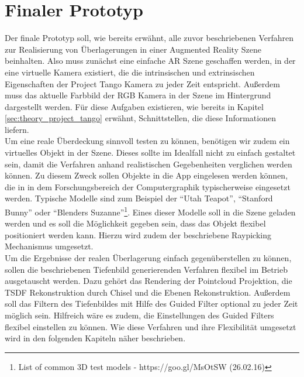 \section{Finaler Prototyp} \label{sec:final_prototype}

Der finale Prototyp soll, wie bereits erwähnt, alle zuvor beschriebenen Verfahren zur Realisierung von Überlagerungen in einer Augmented Reality Szene beinhalten. Also muss zunächst eine einfache AR Szene geschaffen werden, in der eine virtuelle Kamera existiert, die die intrinsischen und extrinsischen Eigenschaften der Project Tango Kamera zu jeder Zeit entspricht. Außerdem muss das aktuelle Farbbild der RGB Kamera in der Szene im Hintergrund dargestellt werden. Für diese Aufgaben existieren, wie bereits in Kapitel \ref{sec:theory_project_tango} erwähnt, Schnittstellen, die diese Informationen liefern. \\

Um eine reale Überdeckung sinnvoll testen zu können, benötigen wir zudem ein virtuelles Objekt in der Szene. Dieses sollte im Idealfall nicht zu einfach gestaltet sein, damit die Verfahren anhand realistischen Gegebenheiten verglichen werden können. Zu diesem Zweck sollen Objekte in die App eingelesen werden können, die in in dem Forschungsbereich der Computergraphik typischerweise eingesetzt werden. Typische Modelle sind zum Beispiel der \enquote{Utah Teapot}, \enquote{Stanford Bunny} oder \enquote{Blenders Suzanne}\footnote{List of common 3D test models - https://goo.gl/MsOtSW (26.02.16)}.  Eines dieser Modelle soll in die Szene geladen werden und es soll die Möglichkeit gegeben sein, dass das Objekt flexibel positioniert werden kann. Hierzu wird zudem der beschriebene Raypicking Mechanismus umgesetzt.\\

Um die Ergebnisse der  realen Überlagerung einfach gegenüberstellen zu können, sollen die beschriebenen Tiefenbild generierenden Verfahren flexibel im Betrieb ausgetauscht werden. Dazu gehört das Rendering der Pointcloud Projektion, die TSDF Rekonstruktion durch Chisel und die Ebenen Rekonstruktion. Außerdem soll das Filtern des Tiefenbildes mit Hilfe des Guided Filter optional zu jeder Zeit möglich sein. Hilfreich wäre es zudem, die Einstellungen des Guided Filters flexibel einstellen zu können. Wie diese Verfahren und ihre Flexibilität umgesetzt wird in den folgenden Kapiteln näher beschrieben.